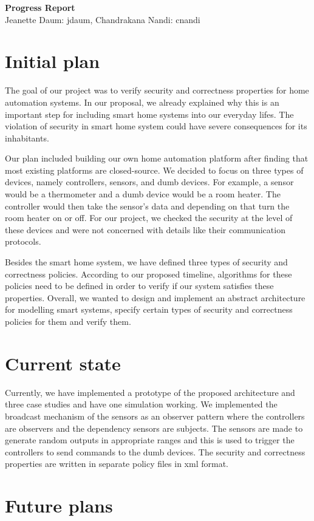 \documentclass{article}
\begin{document}
\begin{center}
\large \textbf{Progress Report}\\
\normalsize {Jeanette Daum: jdaum, Chandrakana Nandi: cnandi}
\end{center}
\section{Initial plan}
The goal of our project was to verify security and correctness properties for home automation systems. In our proposal, we already explained why this is an important step for including smart home systems into our everyday lifes. The violation of security in smart home system could have severe consequences for its inhabitants. 

Our plan included building our own home automation platform after finding that most existing platforms are closed-source. We decided to focus on three types of devices, namely controllers, sensors, and dumb devices. For example, a sensor would be a thermometer and a dumb device would be a room heater. The controller would then take the sensor's data and depending on that turn the room heater on or off. For our project, we checked the security at the level of these devices and were not concerned with details like their communication protocols. 

Besides the smart home system, we have defined three types of security and correctness policies. According to our proposed timeline, algorithms for these policies need to be defined in order to verify if our system satisfies these properties. Overall, we wanted to design and implement an abstract architecture for modelling smart systems, specify certain types of security and correctness policies for them and verify them. 


\section{Current state}
Currently, we have implemented a prototype of the proposed architecture and three case studies and have one simulation working. We implemented the broadcast mechanism of the sensors as an observer pattern where the controllers are observers and the dependency sensors are subjects. The sensors are made to generate random outputs in appropriate ranges and this is used to trigger the controllers to send commands to the dumb devices. The security and correctness properties are written in separate policy files in xml format. 
\section{Future plans}
\end{document}
